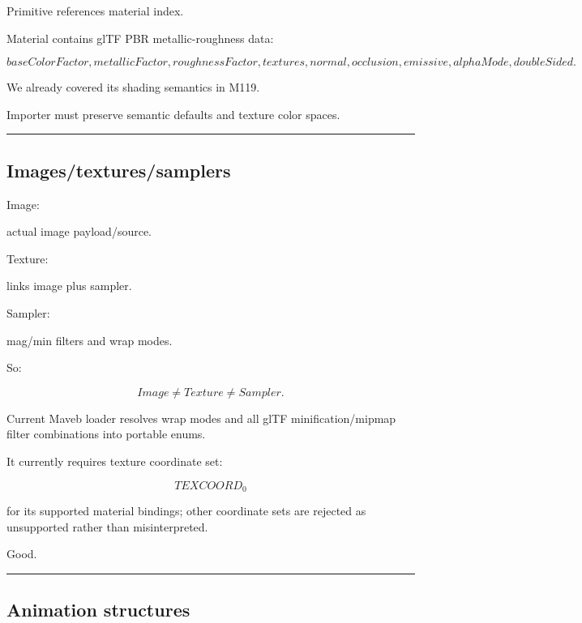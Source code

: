 Primitive references material index.

Material contains glTF PBR metallic-roughness data:

\[
baseColorFactor,
metallicFactor,
roughnessFactor,
textures,
normal,
occlusion,
emissive,
alphaMode,
doubleSided.
\]

We already covered its shading semantics in M119.

Importer must preserve semantic defaults and texture color spaces.

\begin{center}\rule{0.5\linewidth}{0.5pt}\end{center}

\subsection{Images/textures/samplers}\label{04-visual-computing-ii-ch041-imagestexturessamplers}

\hypertarget{04-visual-computing-ii-ch041-imagestexturessamplers}{}

Image:

actual image payload/source.

Texture:

links image plus sampler.

Sampler:

mag/min filters and wrap modes.

So:

\[
\boxed{
Image
\neq
Texture
\neq
Sampler.
}
\]

Current Maveb loader resolves wrap modes and all glTF minification/mipmap filter combinations into portable enums.

It currently requires texture coordinate set:

\[
TEXCOORD_0
\]

for its supported material bindings; other coordinate sets are rejected as unsupported rather than misinterpreted.

Good.

\begin{center}\rule{0.5\linewidth}{0.5pt}\end{center}

\subsection{Animation structures}\label{04-visual-computing-ii-ch041-animation-structures}

\hypertarget{04-visual-computing-ii-ch041-animation-structures}{}

